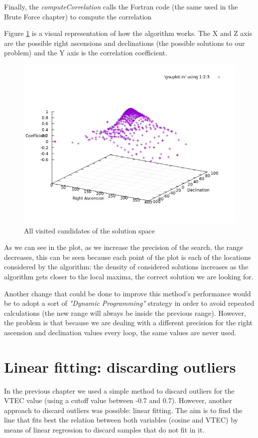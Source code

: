 Finally, the \textit{computeCorrelation} calls the Fortran code (the same used in the Brute Force chapter) to compute the correlation

Figure \ref{fig:consideredSolutions} is a visual representation of how the algorithm works. The X and Z axis are the possible right ascensions
and declinations (the possible solutions to our problem) and the Y axis is the correlation coefficient.

\begin{figure}[!htb]
	\begin{centering}
		\includegraphics[width=0.5\linewidth]{images/ch6/hillClimbing/resultsAll.png}
		\caption{All visited candidates of the solution space}
		\label{fig:consideredSolutions}
	\end{centering}
\end{figure}

As we can see in the plot, as we increase the precision of the search, the range decreases, this can be seen because each point
of the plot is each of the locations considered by the algorithm: the density of considered solutions increases as the algorithm gets closer to the local maxima, the correct solution we are looking for.

Another change that could be done to improve this method's performance would be to adopt a sort of \textit{"Dynamic Programming"} strategy in order to avoid repeated calculations (the new range will always be inside the previous range). However, the problem is that because we are dealing with a different precision for the right ascension and declination values every loop, the same values are never used.

\section{Linear fitting: discarding outliers}

In the previous chapter we used a simple method to discard outliers for the VTEC value (using a cutoff value between -0.7 and 0.7). However, another approach to discard outliers was possible: linear fitting. 
The aim is to find the line that fits best the relation between both variables (cosine and VTEC) by means of linear regression to discard samples that do not fit in it.

